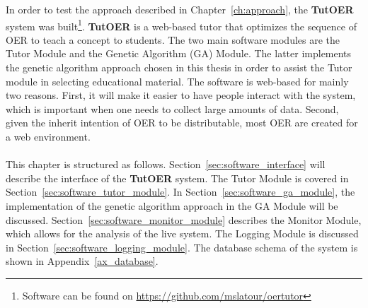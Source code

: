 In order to test the approach described in Chapter~\ref{ch:approach}, the
\textbf{TutOER} system was built\footnote{Software can be found on
	\url{https://github.com/mslatour/oertutor}}. \textbf{TutOER} is a web-based tutor
that optimizes the sequence of OER to teach a concept to students.
The two main software modules are the Tutor Module and the Genetic Algorithm
(GA) Module. The latter implements the genetic algorithm approach chosen in
this thesis in order to assist the Tutor module in selecting educational
material. The software is web-based for mainly two reasons. First, it will make
it easier to have people interact with the system, which is important when one
needs to collect large amounts of data. Second, given the inherit intention of
OER to be distributable, most OER are created for a web environment.\\\\
\noindent
This chapter is structured as follows. Section~\ref{sec:software_interface} will
describe the interface of the \textbf{TutOER} system. The Tutor Module is covered in
Section~\ref{sec:software_tutor_module}. In
Section~\ref{sec:software_ga_module}, the implementation of the genetic
algorithm approach in the GA Module will be discussed.
Section~\ref{sec:software_monitor_module} describes the Monitor Module, which
allows for the analysis of the live system. The Logging Module is discussed in
Section~\ref{sec:software_logging_module}. The database schema of the system is
shown in Appendix~\ref{ax_database}.
